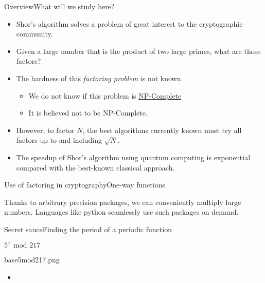 
\begin{frame}{Overview}{What will we study here?}

\begin{itemize}
    \item Shor's algorithm solves a problem of great interest to the cryptographic community.
    \item Given a large number that is the product of two large primes, what are those factors?
    \item The hardness of this \emph{factoring problem} is not known.
    \begin{itemize}
        \item We do not know if this problem is \href{https://en.wikipedia.org/wiki/NP-completeness}{NP-Complete}
        \item It is believed not to be NP-Complete.
    \end{itemize}
    \item However, to factor $N$, the best algorithms currently known must try all factors up to and including $\sqrt{N}$.
    \item The speedup of Shor's algorithm using quantum computing is exponential compared with the best-known classical approach.
\end{itemize}
    
\end{frame}

\begin{frame}{Use of factoring in cryptography}{One-way functions}

\BigSkip{}%
Thanks to arbitrary precision packages, we can conveniently multiply large numbers.  Languages like python seamlessly use such packages on demand.
\end{frame}

\begin{frame}{Secret sauce}{Finding the period of a periodic function}
\Vskip{-4em}\begin{center}
$5^{x}\mbox{ mod 217}$\\
\begin{Pixture}[width=0.5\textwidth]{27}{base5mod217.png}
\end{Pixture}\end{center}
\begin{itemize}
    \item 
\end{itemize}
    
\end{frame}